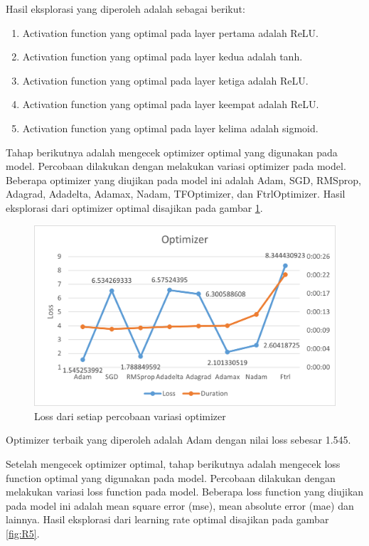 \documentclass[a4, 12px]{article}
\theoremstyle{definition}
\theoremstyle{remark}
\begin{document}
Hasil eksplorasi yang diperoleh adalah sebagai berikut:
\begin{enumerate}[noitemsep]
	\item Activation function yang optimal pada layer pertama adalah ReLU.
	\item Activation function yang optimal pada layer kedua adalah tanh.
	\item Activation function yang optimal pada layer ketiga adalah ReLU.
	\item Activation function yang optimal pada layer keempat adalah ReLU.
	\item Activation function yang optimal pada layer kelima adalah sigmoid.
\end{enumerate}

Tahap berikutnya adalah mengecek optimizer optimal yang digunakan pada model. Percobaan dilakukan dengan melakukan variasi optimizer pada model. Beberapa optimizer yang diujikan pada model ini adalah Adam, SGD, RMSprop, Adagrad, Adadelta, Adamax, Nadam, TFOptimizer, dan FtrlOptimizer. Hasil eksplorasi dari optimizer optimal disajikan pada gambar \ref{fig:R4}.

\begin{figure}[!h]
	\centering
	\includegraphics[width=0.7\linewidth]{src/R4}
	\caption{Loss dari setiap percobaan variasi optimizer}
	\label{fig:R4}
\end{figure}

Optimizer terbaik yang diperoleh adalah Adam dengan nilai loss sebesar 1.545.

Setelah mengecek optimizer optimal, tahap berikutnya adalah mengecek loss function optimal yang digunakan pada model. Percobaan dilakukan dengan melakukan variasi loss function pada model. Beberapa loss function yang diujikan pada model ini adalah mean square error (mse), mean absolute error (mae) dan lainnya. Hasil eksplorasi dari learning rate optimal disajikan pada gambar \ref{fig:R5}.
\end{document}
